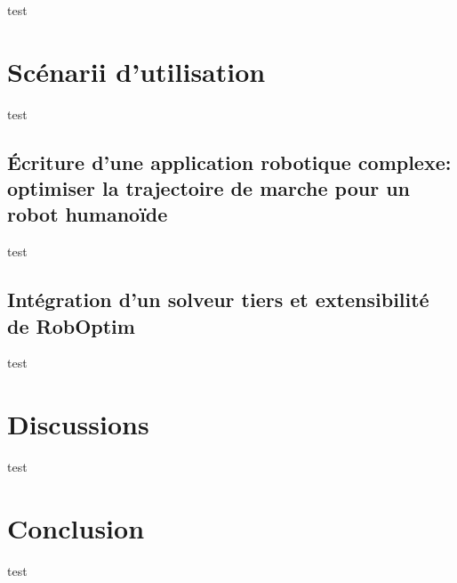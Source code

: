 test

\section{Scénarii d'utilisation}

test

\subsection[FIXME]{\'Ecriture d'une application robotique complexe: optimiser la trajectoire de marche pour un robot humanoïde}

test

\subsection{Intégration d'un solveur tiers et extensibilité de RobOptim}

test

\section{Discussions}

test

\section{Conclusion}

test
